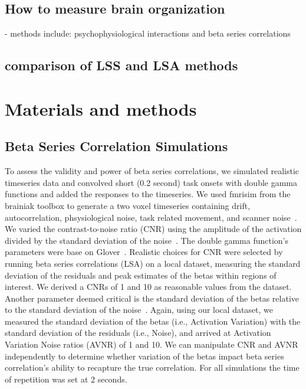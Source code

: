 \documentclass[10pt,letterpaper]{article}
\begin{document}
\subsection{How to measure brain organization}
- methods include: psychophysiological interactions and beta series correlations

\subsection{comparison of LSS and LSA methods}

\section*{Materials and methods}
\subsection*{Beta Series Correlation Simulations}
To assess the validity and power of beta series correlations,
we simulated realistic timeseries data and convolved short (0.2 second) task onsets with double gamma functions
and added the responses to the timeseries.
We used fmrisim from the brainiak toolbox to generate a two voxel timeseries
containing drift, autocorrelation, phsysiological noise,
task related movement, and scanner noise~\cite{Ellis2020}.
We varied the contrast-to-noise ratio (CNR) using the amplitude of the activation
divided by the standard deviation of the noise~\cite{Welvaert2013a}.
The double gamma function's parameters were base on Glover~\cite{Glover1999,Welvaert2011}.
Realistic choices for CNR were selected by running beta series correlations (LSA)
on a local dataset, measuring the standard deviation of the residuals and peak
estimates of the betas within regions of interest.
We derived a CNRs of 1 and 10 as reasonable values from the dataset.
Another parameter deemed critical is the standard deviation of the betas relative
to the standard deviation of the noise~\cite{Abdulrahman2016}.
Again, using our local dataset, we measured the standard deviation of the betas
(i.e., Activation Variation) with
the standard deviation of the residuals (i.e., Noise),
and arrived at Activation Variation Noise ratios (AVNR) of 1 and 10.
We can manipulate CNR and AVNR independently to determine whether variation of the betas
impact beta series correlation's ability to recapture the true correlation.
For all simulations the time of repetition was set at 2 seconds.
\end{document}
